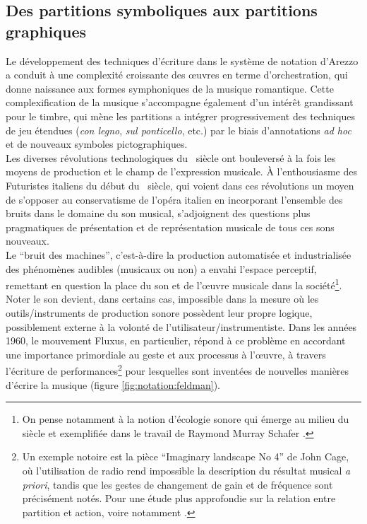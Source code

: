 \subsection{Des partitions symboliques aux partitions graphiques}

\noindent Le développement des techniques d'écriture dans le système de notation d'Arezzo a conduit à une complexité croissante des œuvres en terme d'orchestration, qui donne naissance aux formes symphoniques de la musique romantique. Cette complexification de la musique s'accompagne également d'un intérêt grandissant pour le timbre, qui mène les partitions a intégrer progressivement des techniques de jeu étendues (\textit{con legno}, \textit{sul ponticello}, etc.) par le biais d'annotations \textit{ad hoc} et de nouveaux symboles pictographiques.\\
\indent Les diverses révolutions technologiques du ~siècle ont bouleversé à la fois les moyens de production et le champ de l'expression musicale. À l'enthousiasme des Futuristes italiens du début du ~siècle, qui voient dans ces révolutions un moyen de s'opposer au conservatisme de l'opéra italien en incorporant l'ensemble des bruits dans le domaine du son musical, s'adjoignent des questions plus pragmatiques de présentation et de représentation musicale de tous ces sons nouveaux.\\
\indent Le ``bruit des machines'', c'est-à-dire la production automatisée et industrialisée des phénomènes audibles (musicaux ou non) a envahi l'espace perceptif, remettant en question la place du son et de l'œuvre musicale dans la société\footnote{On pense notamment à la notion d'écologie sonore qui émerge au milieu du siècle et exemplifiée dans le travail de Raymond Murray Schafer \cite{schafer_paysage_1979}.}. Noter le son devient, dans certains cas, impossible dans la mesure où les outils/instruments de production sonore possèdent leur propre logique, possiblement externe à la volonté de l'utilisateur/instrumentiste. Dans les années 1960, le mouvement Fluxus, en particulier, répond à ce problème en accordant une importance primordiale au geste et aux processus à l'œuvre, à travers l'écriture de performances\footnote{Un exemple notoire est la pièce ``Imaginary landscape No 4'' de John Cage, où l'utilisation de radio rend impossible la description du résultat musical \textit{a priori}, tandis que les gestes de changement de gain et de fréquence sont précisément notés. Pour une étude plus approfondie sur la relation entre partition et action, voire notamment \cite{kojs_notating_2011}.} pour lesquelles sont inventées de nouvelles manières d'écrire la musique (figure \ref{fig:notation:feldman}).\\
